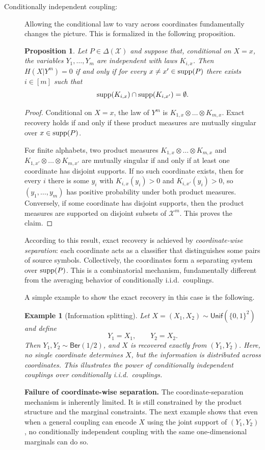 \documentclass[journal]{IEEEtran}
\newtheorem{proposition}{Proposition}
\newtheorem{example}{Example}
\def\supp{\mathop{\rm supp}}
\def\calX{{\mathcal X}}
\newcommand{\1}{\mathbf{1}}
\newcommand{\Ber}{\mathsf{Ber}}
\newcommand{\Unif}{\mathsf{Unif}}
\begin{document}
\begin{description}
\item[Conditionally independent coupling:] Allowing the conditional law to vary across coordinates fundamentally changes the picture. This is formalized in the following proposition. 
\begin{proposition}
Let $P\in\Delta(\calX)$ and suppose that, conditional on $X=x$, the variables $Y_1,\dots,Y_m$ are independent with laws $K_{i,x}$. Then $H(X| Y^m)=0$ if and only if for every $x\neq x'\in\supp(P)$ there exists $i\in[m]$ such that
$$
\supp(K_{i,x}) \cap \supp(K_{i,x'}) = \emptyset.
$$
\end{proposition}
\begin{proof}
Conditional on $X=x$, the law of $Y^m$ is $K_{1,x}\otimes\dots\otimes K_{m,x}$. Exact recovery holds if and only if these product measures are mutually singular over $x\in\supp(P)$.

For finite alphabets, two product measures $K_{1,x}\otimes\dots\otimes K_{m,x}$ and $K_{1,x'}\otimes\dots\otimes K_{m,x'}$ are mutually singular if and only if at least one coordinate has disjoint supports. If no such coordinate exists, then for every $i$ there is some $y_i$ with $K_{i,x}(y_i)>0$ and $K_{i,x'}(y_i)>0$, so $(y_1,\dots,y_m)$ has positive probability under both product measures. Conversely, if some coordinate has disjoint supports, then the product measures are supported on disjoint subsets of $\calX^m$. This proves the claim.
\end{proof}
According to this result, exact recovery is achieved by \emph{coordinate-wise separation}: each coordinate acts as a classifier that distinguishes some pairs of source symbols. Collectively, the coordinates form a separating system over $\supp(P)$. This is a combinatorial mechanism, fundamentally different from the averaging behavior of conditionally i.i.d.\ couplings.

A simple example to show the exact recovery in this case is the following.  
\begin{example} [Information splitting]
Let $X=(X_1,X_2)\sim \Unif(\{0,1\}^2)$ and define
$$
Y_1 = X_1, \qquad Y_2 = X_2.
$$
Then $Y_1,Y_2\sim \Ber(1/2)$, and $X$ is recovered exactly from $(Y_1,Y_2)$. Here, no single coordinate determines $X$, but the information is \emph{distributed} across coordinates. This illustrates the power of conditionally independent couplings over conditionally i.i.d.\ couplings.
\end{example}
\noindent\textbf{Failure of coordinate-wise separation.}
The coordinate-separation mechanism is inherently limited. It is still constrained by the product structure and the marginal constraints. The next example shows that even when a general coupling can encode $X$ using the joint support of $(Y_1,Y_2)$, no
conditionally independent coupling with the same one-dimensional marginals can
do so.


\end{description}
\end{document}
